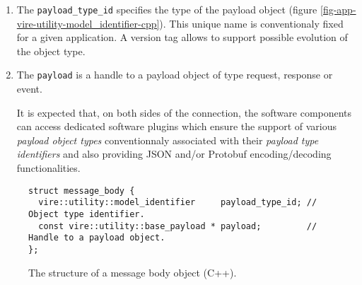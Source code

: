 \begin{enumerate}

\item The \texttt{payload\_type\_id} specifies the type of the payload
  object   (figure   \ref{fig-app-vire-utility-model_identifier-cpp}).
  This unique name  is conventionaly fixed for a  given application. A
  version tag allows to support possible evolution of the object type.

\item The  \texttt{payload} is a  handle to  a payload object  of type
  request, response or event.




  It is expected  that, on both sides of the  connection, the software
  components can  access dedicated  software plugins which  ensure the
  support  of  various   \emph{payload  object  types}  conventionnaly
  associated  with  their  \emph{payload type  identifiers}  and  also
  providing JSON and/or Protobuf encoding/decoding functionalities.


\end{enumerate}

\begin{figure}[h]
\vskip 10pt
\small
\begin{Verbatim}[frame=single,xleftmargin=0.cm,label=\fbox{C++}]
struct message_body {
  vire::utility::model_identifier     payload_type_id; // Object type identifier.
  const vire::utility::base_payload * payload;         // Handle to a payload object.
};
\end{Verbatim}
\normalsize
\caption{The structure of a message body object (C++).}
\label{fig-app-vire-message-message_body-cpp}
\end{figure}

